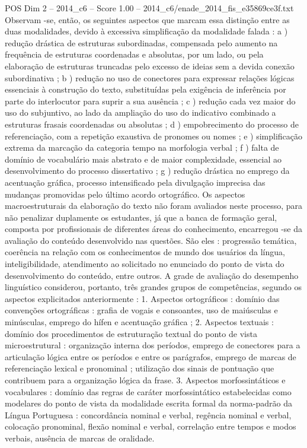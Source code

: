 \begin{textsample}{POS Dim 2 – 2014\_c6 – Score 1.00 – 2014\_c6/enade\_2014\_fis\_e35869ce3f.txt}
Observam -se, então, os seguintes aspectos que marcam essa distinção entre as duas modalidades, devido à excessiva simplificação da modalidade falada : a ) redução drástica de estruturas subordinadas, compensada pelo aumento na frequência de estruturas coordenadas e absolutas, por um lado, ou pela elaboração de estruturas truncadas pelo excesso de ideias sem a devida conexão subordinativa ; b ) redução no uso de conectores para expressar relações lógicas essenciais à construção do texto, substituídas pela exigência de inferência por parte do interlocutor para suprir a sua ausência ; c ) redução cada vez maior do uso do subjuntivo, ao lado da ampliação do uso do indicativo combinado a estruturas frasais coordenadas ou absolutas ; d ) empobrecimento do processo de referenciação, com a repetição exaustiva de pronomes ou nomes ; e ) simplificação extrema da marcação da categoria tempo na morfologia verbal ; f ) falta de domínio de vocabulário mais abstrato e de maior complexidade, essencial ao desenvolvimento do processo dissertativo ; g ) redução drástica no emprego da acentuação gráfica, processo intensificado pela divulgação imprecisa das mudanças promovidas pelo último acordo ortográfico.
Os aspectos macroestruturais da elaboração do texto não foram avaliados neste processo, para não penalizar duplamente os estudantes, já que a banca de formação geral, composta por profissionais de diferentes áreas do conhecimento, encarregou -se da avaliação do conteúdo desenvolvido nas questões.
São eles : progressão temática, coerência na relação com os conhecimentos de mundo dos usuários da língua, inteligibilidade, atendimento ao solicitado no enunciado do ponto de vista do desenvolvimento do conteúdo, entre outros.
A grade de avaliação do desempenho linguístico considerou, portanto, três grandes grupos de competências, segundo os aspectos explicitados anteriormente : 1.
Aspectos ortográficos : domínio das convenções ortográficas : grafia de vogais e consoantes, uso de maiúsculas e minúsculas, emprego do hífen e acentuação gráfica ; 2.
Aspectos textuais : domínio dos procedimentos de estruturação textual do ponto de vista microestrutural : organização interna dos períodos, emprego de conectores para a articulação lógica entre os períodos e entre os parágrafos, emprego de marcas de referenciação lexical e pronominal ; utilização dos sinais de pontuação que contribuem para a organização lógica da frase. 3.
Aspectos morfossintáticos e vocabulares : domínio das regras de caráter morfossintático estabelecidas como modelares do ponto de vista da modalidade escrita formal da norma-padrão da Língua Portuguesa : concordância nominal e verbal, regência nominal e verbal, colocação pronominal, flexão nominal e verbal, correlação entre tempos e modos verbais, ausência de marcas de oralidade.

\end{textsample}
